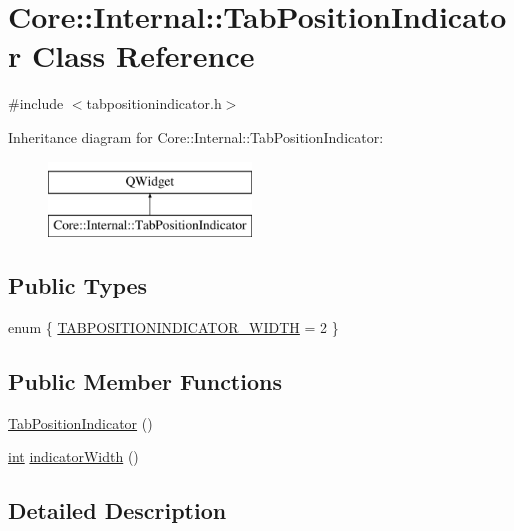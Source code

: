 \hypertarget{class_core_1_1_internal_1_1_tab_position_indicator}{\section{Core\-:\-:Internal\-:\-:Tab\-Position\-Indicator Class Reference}
\label{class_core_1_1_internal_1_1_tab_position_indicator}
}


{\ttfamily \#include $<$tabpositionindicator.\-h$>$}

Inheritance diagram for Core\-:\-:Internal\-:\-:Tab\-Position\-Indicator\-:\begin{figure}[H]
\begin{center}
\leavevmode
\includegraphics[height=2.000000cm]{class_core_1_1_internal_1_1_tab_position_indicator}
\end{center}
\end{figure}
\subsection*{Public Types}
\begin{DoxyCompactItemize}
\item 
enum \{ \hyperlink{group___core_plugin_gga58569aa4f8ac521dc0ffc7b2cbe9b7bdad22687e73a02e0040f229636561a0baa}{T\-A\-B\-P\-O\-S\-I\-T\-I\-O\-N\-I\-N\-D\-I\-C\-A\-T\-O\-R\-\_\-\-W\-I\-D\-T\-H} = 2
 \}
\end{DoxyCompactItemize}
\subsection*{Public Member Functions}
\begin{DoxyCompactItemize}
\item 
\hyperlink{group___core_plugin_ga4452856fc2ef86ff364a8943287aacd1}{Tab\-Position\-Indicator} ()
\item 
\hyperlink{ioapi_8h_a787fa3cf048117ba7123753c1e74fcd6}{int} \hyperlink{group___core_plugin_gac5f4584d94f1a19b15ac016da901d644}{indicator\-Width} ()
\end{DoxyCompactItemize}


\subsection{Detailed Description}



